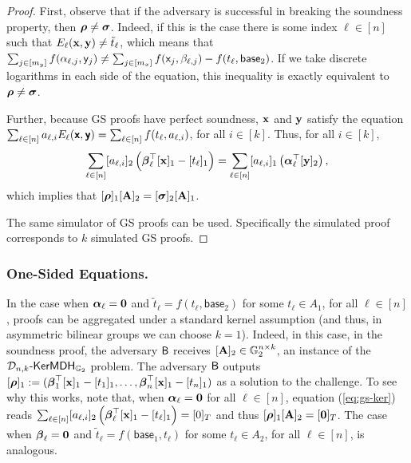 \begin{proof}
First, observe that if the adversary is successful in breaking the soundness property, then ${\boldsymbol \rho} \neq {\boldsymbol \sigma}$. Indeed, 
if this is the case there is some index $\ell \in [n]$ such that 
$E_{\ell}(\mathbf{x},\mathbf{y}) \neq \tilde{t}_{\ell}$, which means that 
$\sum_{j\in[m_y]} f(\alpha_{\ell,j}, \mathsf{y}_j) \neq 
\sum_{j\in[m_x]}  f(\mathsf{x}_j, \beta_{\ell,j}) - f(t_{\ell},\mathsf{base}_{2})$.  
If we take discrete logarithms in each side of the equation, this inequality is exactly equivalent to
${\boldsymbol \rho} \neq {\boldsymbol \sigma}$.


Further, because GS proofs have perfect soundness, $\mathbf{x}$ and $\mathbf{y}$ satisfy 
the equation $\sum_{\ell\in[n]} a_{\ell,i} E_{\ell}(\textbf{\textsf{x}},\textbf{\textsf{y}})= \sum_{\ell \in [n]} f(t_{\ell}, a_{\ell,i})$, for all $i \in [k]$.
Thus, for all $i\in[k]$, 
\begin{equation}
\sum_{\ell\in[n]} [{a}_{\ell,i}]_2 \left({\boldsymbol \beta}_\ell^\top[\mathbf{x}]_1 - [{t}_{\ell}]_1 \right)  = \sum_{\ell \in [n]} [{a}_{\ell,i}]_1
\left({\boldsymbol \alpha}^\top_\ell[\mathbf{y}]_2\right),
\label{eq:gs-ker}
\end{equation}
which implies that $[{\boldsymbol \rho}]_1[\mathbf{{A}}]_2=[{\boldsymbol \sigma}]_2[\mathbf{{A}}]_1$.

  The same simulator of GS proofs can be used. Specifically
the simulated proof corresponds to $k$ simulated GS proofs.
\end{proof}

\subsubsection{One-Sided Equations.} In the case when ${\boldsymbol \alpha}_{\ell}=\mathbf{{0}}$ and $\tilde{t}_{\ell}=f(t_{\ell},\mathsf{base}_{2})$ for some $t_{\ell} \in A_1$, for all $\ell\in[n]$, proofs can be aggregated under a standard kernel assumption (and thus, in asymmetric bilinear groups we can choose $k=1$). Indeed, 
in this case, in the soundness proof, the adversary $\mathsf{B}$ receives $[\mathbf{{A}}]_2\in\mathbb{G}_2^{n\times k}$, an instance of the $\mathcal{D}_{n,k}\mbox{-}\mathsf{KerMDH}_{\mathbb{G}_2}$ problem. The adversary $\mathsf{B}$ outputs $[{\boldsymbol \rho}]_1:=({\boldsymbol \beta}_1^\top[\mathbf{x}]_1 -[{t}_{1}]_1,\ldots,
{\boldsymbol \beta}_{n}^\top[\mathbf{x}]_1 -[{t}_{n}]_1) $ as a solution to the challenge. To see why this works, note that, when ${\boldsymbol \alpha}_{\ell}=\mathbf{{0}}$ for all $\ell\in[n]$, equation (\ref{eq:gs-ker}) reads $\sum_{\ell\in[n]} [{a}_{\ell,i}]_2 \left({\boldsymbol \beta}_\ell^\top [\mathbf{x}]_1 - [{t}_{\ell}]_1 \right)  = [{0}]_T$ and thus $[{\boldsymbol \rho}]_1[\mathbf{{A}}]_2=[\mathbf{{0}}]_T$.  The case when ${\boldsymbol \beta}_\ell=\mathbf{{0}}$ and $\tilde{t}_{\ell}=f(\mathsf{base}_{1},t_{\ell})$ for some $t_{\ell} \in A_2$, for all $\ell\in[n]$, is analogous. 

